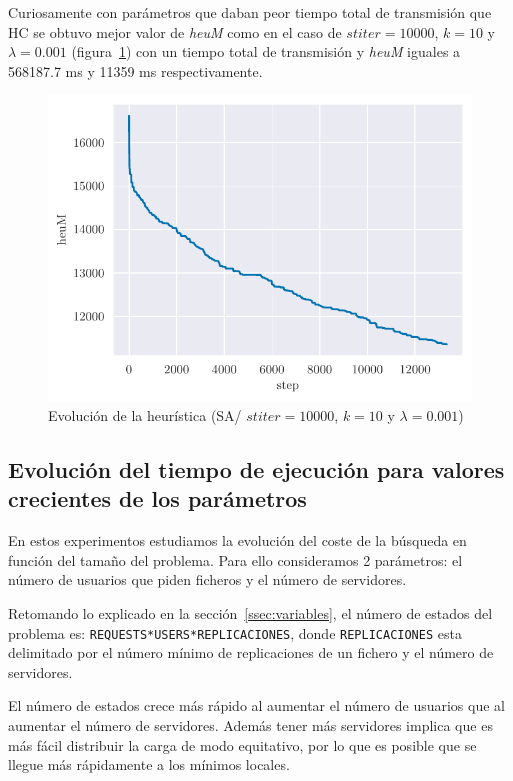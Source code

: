 Curiosamente con parámetros que daban peor tiempo total de transmisión que HC se obtuvo mejor valor de \emph{heuM} como en el caso de $stiter=10000$, $k=10$ y $\lambda=0.001$ (figura~\ref{fig:ex3_heu_steps-1000000-10000-10-0.001}) con un tiempo total de transmisión y \emph{heuM} iguales a 568187.7 ms y 11359 ms respectivamente.

\begin{figure}[H]
    \centering
    \includegraphics{include/plots/ex3_heu_steps-1000000-10000-10-0.001.pdf}
    \caption{Evolución de la heurística (SA/ $stiter=10000$, $k=10$ y $\lambda=0.001$)}
    \label{fig:ex3_heu_steps-1000000-10000-10-0.001} 
\end{figure}

\pagebreak


\subsection{Evolución del tiempo de ejecución para valores crecientes de los parámetros}

En estos experimentos estudiamos la evolución del coste de la búsqueda en función del tamaño del
problema. Para ello consideramos 2 parámetros: el número de usuarios que piden ficheros y el número
de servidores.

Retomando lo explicado en la sección~\ref{ssec:variables}, el número de estados del problema es:
\texttt{REQUESTS*USERS*REPLICACIONES}, donde \texttt{REPLICACIONES} esta delimitado por
el número mínimo de replicaciones de un fichero y el número de servidores.

\begin{hyp*}
El número de estados crece más rápido al aumentar el número de usuarios que al aumentar
el número de servidores. Además tener más servidores implica que es más fácil distribuir la carga de modo
equitativo, por lo que es posible que se llegue más rápidamente a los mínimos locales.
\end{hyp*}

